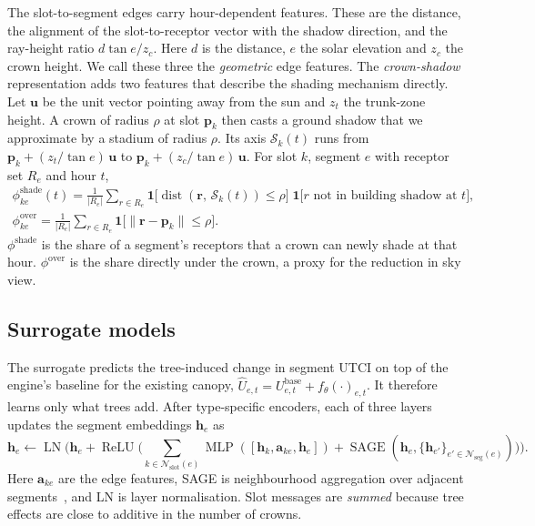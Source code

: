 \documentclass[preprint,12pt,authoryear]{elsarticle}
\begin{document}
The slot-to-segment edges carry hour-dependent features. These are the distance, the alignment of the slot-to-receptor vector with the shadow direction, and the ray-height ratio $d\tan e/z_c$. Here $d$ is the distance, $e$ the solar elevation and $z_c$ the crown height. We call these three the \emph{geometric} edge features. The \emph{crown-shadow} representation adds two features that describe the shading mechanism directly. Let $\mathbf{u}$ be the unit vector pointing away from the sun and $z_t$ the trunk-zone height. A crown of radius $\rho$ at slot $\mathbf{p}_k$ then casts a ground shadow that we approximate by a stadium of radius $\rho$. Its axis $\mathcal{S}_k(t)$ runs from $\mathbf{p}_k + (z_t/\tan e)\,\mathbf{u}$ to $\mathbf{p}_k + (z_c/\tan e)\,\mathbf{u}$. For slot $k$, segment $e$ with receptor set $R_e$ and hour $t$,
\begin{equation}
  \begin{gathered}
  \phi^\mathrm{shade}_{ke}(t) = \frac{1}{|R_e|}\sum_{r\in R_e} \mathbf{1}\big[\operatorname{dist}(\mathbf{r},\,\mathcal{S}_k(t)) \le \rho\big]\;\mathbf{1}\big[r \text{ not in building shadow at } t\big],\\
  \phi^\mathrm{over}_{ke} = \frac{1}{|R_e|}\sum_{r\in R_e} \mathbf{1}\big[\lVert \mathbf{r}-\mathbf{p}_k\rVert \le \rho\big].
  \end{gathered}
\end{equation}
$\phi^\mathrm{shade}$ is the share of a segment's receptors that a crown can newly shade at that hour. $\phi^\mathrm{over}$ is the share directly under the crown, a proxy for the reduction in sky view.

\subsection{Surrogate models}\label{sec:surrogates}

The surrogate predicts the tree-induced change in segment UTCI on top of the engine's baseline for the existing canopy, $\hat U_{e,t} = U^\mathrm{base}_{e,t} + f_\theta(\cdot)_{e,t}$. It therefore learns only what trees add. After type-specific encoders, each of three layers updates the segment embeddings $\mathbf{h}_e$ as
\begin{equation}
  \mathbf{h}_e \leftarrow \operatorname{LN}\Big(\mathbf{h}_e + \operatorname{ReLU}\big(\textstyle\sum_{k\in\mathcal{N}_\mathrm{slot}(e)} \operatorname{MLP}([\mathbf{h}_k, \mathbf{a}_{ke}, \mathbf{h}_e]) + \operatorname{SAGE}(\mathbf{h}_e, \{\mathbf{h}_{e'}\}_{e'\in\mathcal{N}_\mathrm{seg}(e)})\big)\Big).
\end{equation}
Here $\mathbf{a}_{ke}$ are the edge features, SAGE is neighbourhood aggregation over adjacent segments~\citep{hamilton2017}, and LN is layer normalisation. Slot messages are \emph{summed} because tree effects are close to additive in the number of crowns.
\end{document}
